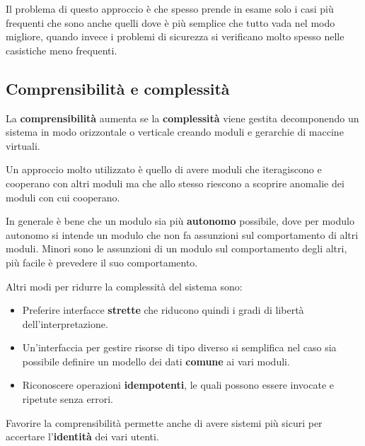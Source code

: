 Il problema di questo approccio è che spesso prende in esame solo i casi più frequenti che sono anche quelli dove è
più semplice che tutto vada nel modo migliore, quando invece i problemi di sicurezza si verificano molto spesso nelle
casistiche meno frequenti.

\subsection{Comprensibilità e complessità}
La \textbf{comprensibilità} aumenta se la \textbf{complessità} viene gestita decomponendo un sistema in modo
orizzontale o verticale creando moduli e gerarchie di maccine virtuali.

Un approccio molto utilizzato è quello di avere moduli che iteragiscono e cooperano con altri moduli ma che allo
stesso riescono a scoprire anomalie dei moduli con cui cooperano.

In generale è bene che un modulo sia più \textbf{autonomo} possibile, dove per modulo autonomo si intende un modulo
che non fa assunzioni sul comportamento di altri moduli. Minori sono le assunzioni di un modulo sul comportamento
degli altri, più facile è prevedere il suo comportamento.

Altri modi per ridurre la complessità del sistema sono:
\begin{itemize}
	\item Preferire interfacce \textbf{strette} che riducono quindi i gradi di libertà dell'interpretazione.
	\item Un'interfaccia per gestire risorse di tipo diverso si semplifica nel caso sia possibile definire un modello
	      dei dati \textbf{comune} ai vari moduli.
	\item Riconoscere operazioni \textbf{idempotenti}, le quali possono essere invocate e ripetute senza errori.
\end{itemize}
Favorire la comprensibilità permette anche di avere sistemi più sicuri per accertare l'\textbf{identità} dei vari
utenti.